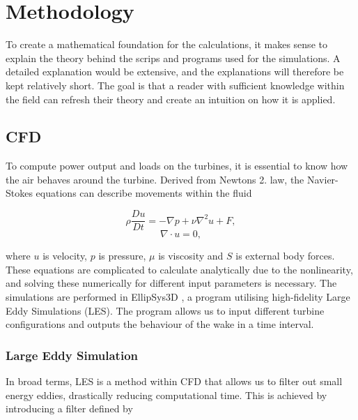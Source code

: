 \chapter{Methodology}

To create a mathematical foundation for the calculations, it makes sense to explain the theory behind the scrips and programs used for the simulations. A detailed explanation would be extensive, and the explanations will therefore be kept relatively short. The goal is that a reader with sufficient knowledge within the field can refresh their theory and create an intuition on how it is applied. 


\section{CFD}
To compute power output and loads on the turbines, it is essential to know how the air behaves around the turbine. Derived from Newtons 2. law, the Navier-Stokes equations can describe movements within the fluid

\begin{equation}
\rho \frac{D u}{D t}=-\nabla p+\nu \nabla^2 u+F,
\label{navier}
\end{equation}
\begin{equation}
    \nabla \cdot u=0,
\end{equation}

where $u$ is velocity, $p$ is pressure, $\mu$ is viscosity and $S$ is external body forces. These equations are complicated to calculate analytically due to the nonlinearity, and solving these numerically for different input parameters is necessary. The simulations are performed in EllipSys3D \cite{ellipsys}, a program utilising high-fidelity Large Eddy Simulations (LES). The program allows us to input different turbine configurations and outputs the behaviour of the wake in a time interval.


\subsection{Large Eddy Simulation}
\label{sec:LES}

In broad terms, LES \cite{LES} is a method within CFD that allows us to filter out small energy eddies, drastically reducing computational time. This is achieved by introducing a filter defined by

